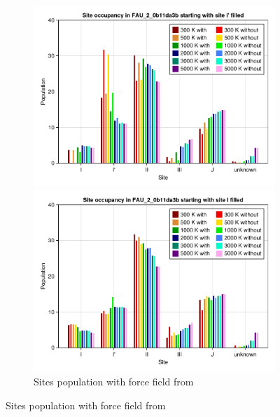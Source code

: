 \documentclass[main.tex]{subfiles}
\begin{document}
\begin{figure}
	\centering
	\begin{subfigure}{\linewidth}
		\begin{minipage}{0.5\linewidth}
			\centering
			\includegraphics[width=\linewidth]{figures/cations/temperaturecalibration_FAU_2_0b11da3b_logicalstart.pdf}
		\end{minipage}\hfill%
		\begin{minipage}{0.5\linewidth}
			\centering
			\includegraphics[width=\linewidth]{figures/cations/temperaturecalibration_FAU_2_0b11da3b_absurdstart.pdf}
		\end{minipage}
		\caption{Sites population with force field from \textcite{BoulfelfelSholl2021}}
	\end{subfigure}


\end{figure}
\end{document}
